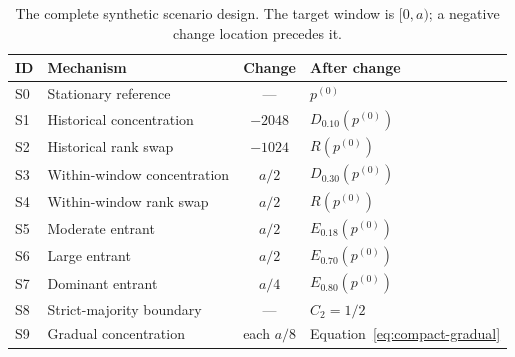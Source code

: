 \begin{table}[!t]
\centering
\footnotesize
\caption{The complete synthetic scenario design. The target window is $[0,a)$; a negative change location precedes it.}
\label{tab:compact-all-scenarios}
\setlength{\tabcolsep}{3pt}
\begin{tabular}{llcl}
\toprule
ID & Mechanism & Change & After change \\
\midrule
S0 & Stationary reference & --- & $p^{(0)}$ \\
S1 & Historical concentration & $-2048$ & $D_{0.10}(p^{(0)})$ \\
S2 & Historical rank swap & $-1024$ & $R(p^{(0)})$ \\
S3 & Within-window concentration & $a/2$ & $D_{0.30}(p^{(0)})$ \\
S4 & Within-window rank swap & $a/2$ & $R(p^{(0)})$ \\
S5 & Moderate entrant & $a/2$ & $E_{0.18}(p^{(0)})$ \\
S6 & Large entrant & $a/2$ & $E_{0.70}(p^{(0)})$ \\
S7 & Dominant entrant & $a/4$ & $E_{0.80}(p^{(0)})$ \\
S8 & Strict-majority boundary & --- & $C_2=1/2$ \\
S9 & Gradual concentration & each $a/8$ & Equation~\eqref{eq:compact-gradual} \\
\bottomrule
\end{tabular}
\end{table}
